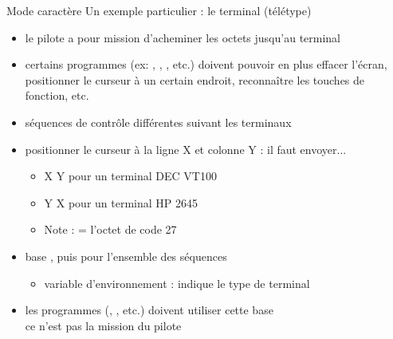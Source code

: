 \begin {frame} {Mode caractère}
    Un exemple particulier : le terminal (télétype)

    \begin {itemize}
	\fB
	\item le pilote a pour mission d'acheminer les octets
	    jusqu'au terminal

	\item certains programmes (ex: , ,
	    , etc.) doivent pouvoir en plus effacer l'écran,
	    positionner le curseur à un certain endroit, reconnaître
	    les touches de fonction, etc.

	\item séquences de contrôle différentes suivant les terminaux
	\item positionner le curseur à la ligne X et colonne Y : il faut envoyer...
	    \begin {itemize}
		\fD
		\item {} \framebox {[} X \framebox {;}
		    Y  pour un terminal DEC VT100

		\item {} \framebox {\&} 
		    Y  X  pour un terminal
		    HP 2645

		\item Note :  = l'octet de code 27
	    \end {itemize}

	\item base , puis  pour l'ensemble
	    des séquences
	    \begin {itemize}
		\item variable d'environnement  : indique
		    le type de terminal
	    \end {itemize}

	\item les programmes (, , etc.) doivent
	    utiliser cette base
	    \\
	    \implique ce n'est pas la mission du pilote

    \end {itemize}
\end {frame}

